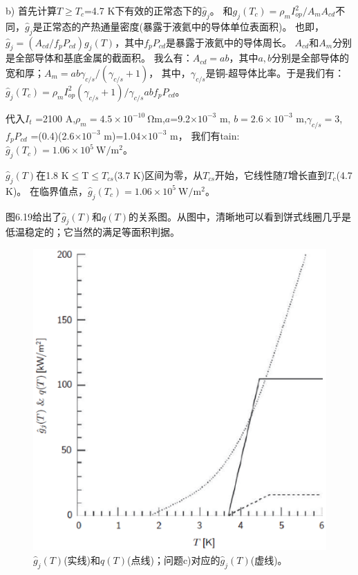 b) 首先计算$T\ge T_c$=4.7 K下有效的正常态下的$\hat{g}_j$。
和$g_j(T_c)=\rho_m I_{op}^2/A_m A_{cd}$不同，$\hat{g}_j$是正常态的产热通量密度(暴露于液氦中的导体单位表面积)。
也即，$\hat{g}_j=(A_{cd}/f_pP_{cd})g_j(T)$，其中$f_p P_{cd}$是暴露于液氦中的导体周长。
$A_{cd}$和$A_{m}$分别是全部导体和基底金属的截面积。
我么有：$A_{cd}=ab$，其中$a,b$分别是全部导体的宽和厚；$A_{m}=ab\gamma_{c/s}/(\gamma_{c/s}+1)$，
其中，$\gamma_{c/s}$是铜-超导体比率。于是我们有：$\hat{g}_j(T_c)=\rho_m I_{op}^2(\gamma_{c/s}+1)/\gamma_{c/s}abf_p P_{cd}$。

代入$I_t$ =2100 A,$\rho_m =4.5\times 10^{-10}\ \mathrm{\Omega m}$,$a$=9.2$\times 10^{-3}$ m, $b=2.6\times 10^{-3}$ m,$\gamma_{c/s}=3$,$f_p P_{cd}$ =(0.4)(2.6$\times 10^{−3}$ m)=1.04$\times 10^{−3}$ m，
我们有tain:$\hat{g}_j(T_c)=1.06\times 10^5\ \mathrm{W/m^2}$。

$\hat{g}_j(T)$在1.8 K$\le$T$\le T_{cs}$(3.7 K)区间为零，从$T_{cs}$开始，它线性随$T$增长直到$T_c$(4.7 K)。
在临界值点，$\hat{g}_j(T_c)=1.06\times 10^5\ \mathrm{W/m^2}$。

图6.19给出了$\hat{g}_j(T)$和$q(T)$的关系图。从图中，清晰地可以看到饼式线圈几乎是低温稳定的；它当然的满足等面积判据。
\begin{figure}[htbp]
	\centering
	\includegraphics[scale=0.7]{chpt6/figs/fig6.19.eps}
	\caption{$\hat{g}_j(T)$(实线)和$q(T)$(点线)；问题c)对应的$\hat{g}_j(T)$(虚线)。}
\end{figure}


